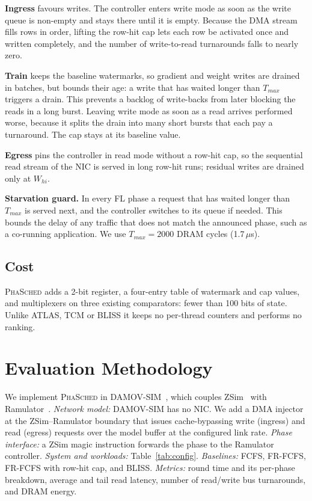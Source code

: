 \documentclass[conference]{IEEEtran}
\newcommand{\name}{\textsc{PhaSched}}
\begin{document}
\textbf{Ingress} favours writes. The controller enters write mode as soon as the write queue is non-empty and stays there until it is empty. Because the DMA stream fills rows in order, lifting the row-hit cap lets each row be activated once and written completely, and the number of write-to-read turnarounds falls to nearly zero.

\textbf{Train} keeps the baseline watermarks, so gradient and weight writes are drained in batches, but bounds their age: a write that has waited longer than $T_{max}$ triggers a drain. This prevents a backlog of write-backs from later blocking the reads in a long burst. Leaving write mode as soon as a read arrives performed worse, because it splits the drain into many short bursts that each pay a turnaround. The cap stays at its baseline value.

\textbf{Egress} pins the controller in read mode without a row-hit cap,
 so the sequential read stream of the NIC is served in long row-hit runs; residual writes are drained only at $W_{hi}$.

\textbf{Starvation guard.} In every FL phase a request that has waited longer than $T_{max}$ is served next, and the controller switches to its queue if needed. This bounds the delay of any traffic that does not match the announced phase, such as a co-running application. We use $T_{max}=2000$ DRAM cycles (1.7\,$\mu$s).

\subsection{Cost}
\name{} adds a 2-bit register, a four-entry table of watermark and cap values, and multiplexers on three existing comparators: fewer than 100 bits of state. Unlike ATLAS, TCM or BLISS it keeps no per-thread counters and performs no ranking.

\section{Evaluation Methodology}
We implement \name{} in DAMOV-SIM~\cite{damov}, which couples ZSim~\cite{zsim} with Ramulator~\cite{ramulator}. \emph{Network model:} DAMOV-SIM has no NIC. We add a DMA injector at the ZSim--Ramulator boundary that issues cache-bypassing write (ingress) and read (egress) requests over the model buffer at the configured link rate. \emph{Phase interface:} a ZSim magic instruction forwards the phase to the Ramulator controller.
\emph{System and workloads:} Table~\ref{tab:config}. \emph{Baselines:} FCFS, FR-FCFS, FR-FCFS with row-hit cap, and BLISS. \emph{Metrics:} round time and its per-phase breakdown, average and tail read latency, number of read/write bus turnarounds, and DRAM energy.
\end{document}
